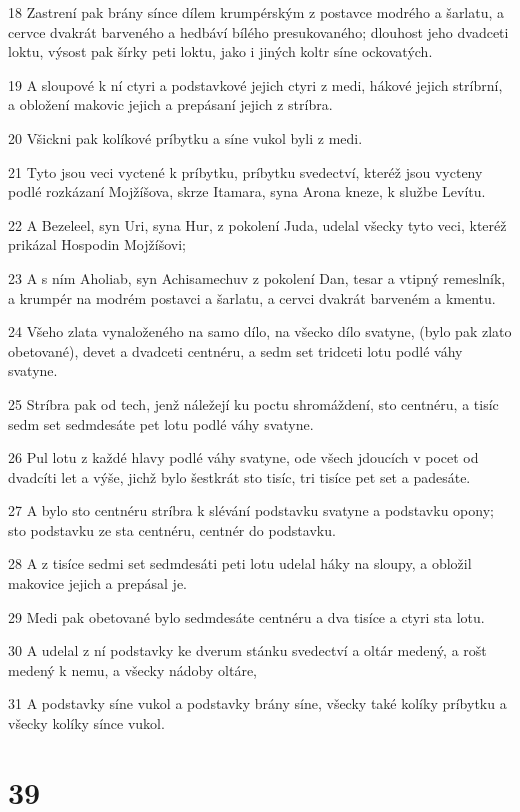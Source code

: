 \par 18 Zastrení pak brány sínce dílem krumpérským z postavce modrého a šarlatu, a cervce dvakrát barveného a hedbáví bílého presukovaného; dlouhost jeho dvadceti loktu, výsost pak šírky peti loktu, jako i jiných koltr síne ockovatých.
\par 19 A sloupové k ní ctyri a podstavkové jejich ctyri z medi, hákové jejich stríbrní, a obložení makovic jejich a prepásaní jejich z stríbra.
\par 20 Všickni pak kolíkové príbytku a síne vukol byli z medi.
\par 21 Tyto jsou veci vyctené k príbytku, príbytku svedectví, kteréž jsou vycteny podlé rozkázaní Mojžíšova, skrze Itamara, syna Arona kneze, k službe Levítu.
\par 22 A Bezeleel, syn Uri, syna Hur, z pokolení Juda, udelal všecky tyto veci, kteréž prikázal Hospodin Mojžíšovi;
\par 23 A s ním Aholiab, syn Achisamechuv z pokolení Dan, tesar a vtipný remeslník, a krumpér na modrém postavci a šarlatu, a cervci dvakrát barveném a kmentu.
\par 24 Všeho zlata vynaloženého na samo dílo, na všecko dílo svatyne, (bylo pak zlato obetované), devet a dvadceti centnéru, a sedm set tridceti lotu podlé váhy svatyne.
\par 25 Stríbra pak od tech, jenž náležejí ku poctu shromáždení, sto centnéru, a tisíc sedm set sedmdesáte pet lotu podlé váhy svatyne.
\par 26 Pul lotu z každé hlavy podlé váhy svatyne, ode všech jdoucích v pocet od dvadcíti let a výše, jichž bylo šestkrát sto tisíc, tri tisíce pet set a padesáte.
\par 27 A bylo sto centnéru stríbra k slévání podstavku svatyne a podstavku opony; sto podstavku ze sta centnéru, centnér do podstavku.
\par 28 A z tisíce sedmi set sedmdesáti peti lotu udelal háky na sloupy, a obložil makovice jejich a prepásal je.
\par 29 Medi pak obetované bylo sedmdesáte centnéru a dva tisíce a ctyri sta lotu.
\par 30 A udelal z ní podstavky ke dverum stánku svedectví a oltár medený, a rošt medený k nemu, a všecky nádoby oltáre,
\par 31 A podstavky síne vukol a podstavky brány síne, všecky také kolíky príbytku a všecky kolíky sínce vukol.

\chapter{39}

